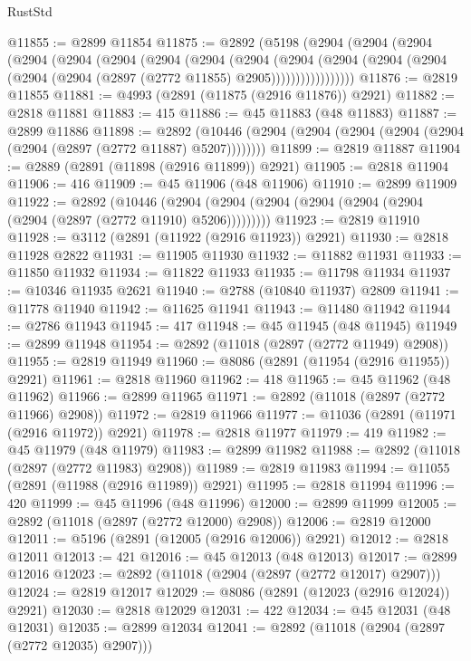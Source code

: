 \begin{lexlean}{RustStd}
\begin{coremodule}
@11855 := @2899 @11854
@11875 := @2892
    (@5198
      (@2904
        (@2904
          (@2904
            (@2904
              (@2904
                (@2904
                  (@2904
                    (@2904
                      (@2904
                        (@2904
                          (@2904
                            (@2904 (@2904 (@2904 (@2904 (@2897 (@2772 @11855) @2905)))))))))))))))))
@11876 := @2819 @11855
@11881 := @4993 (@2891 (@11875 (@2916 @11876)) @2921)
@11882 := @2818 @11881
@11883 := 415
@11886 := @45 @11883 (@48 @11883)
@11887 := @2899 @11886
@11898 := @2892
    (@10446 (@2904 (@2904 (@2904 (@2904 (@2904 (@2904 (@2897 (@2772 @11887) @5207))))))))
@11899 := @2819 @11887
@11904 := @2889 (@2891 (@11898 (@2916 @11899)) @2921)
@11905 := @2818 @11904
@11906 := 416
@11909 := @45 @11906 (@48 @11906)
@11910 := @2899 @11909
@11922 := @2892
    (@10446 (@2904 (@2904 (@2904 (@2904 (@2904 (@2904 (@2904 (@2897 (@2772 @11910) @5206)))))))))
@11923 := @2819 @11910
@11928 := @3112 (@2891 (@11922 (@2916 @11923)) @2921)
@11930 := @2818 @11928 @2822
@11931 := @11905 @11930
@11932 := @11882 @11931
@11933 := @11850 @11932
@11934 := @11822 @11933
@11935 := @11798 @11934
@11937 := @10346 @11935 @2621
@11940 := @2788 (@10840 @11937) @2809
@11941 := @11778 @11940
@11942 := @11625 @11941
@11943 := @11480 @11942
@11944 := @2786 @11943
@11945 := 417
@11948 := @45 @11945 (@48 @11945)
@11949 := @2899 @11948
@11954 := @2892 (@11018 (@2897 (@2772 @11949) @2908))
@11955 := @2819 @11949
@11960 := @8086 (@2891 (@11954 (@2916 @11955)) @2921)
@11961 := @2818 @11960
@11962 := 418
@11965 := @45 @11962 (@48 @11962)
@11966 := @2899 @11965
@11971 := @2892 (@11018 (@2897 (@2772 @11966) @2908))
@11972 := @2819 @11966
@11977 := @11036 (@2891 (@11971 (@2916 @11972)) @2921)
@11978 := @2818 @11977
@11979 := 419
@11982 := @45 @11979 (@48 @11979)
@11983 := @2899 @11982
@11988 := @2892 (@11018 (@2897 (@2772 @11983) @2908))
@11989 := @2819 @11983
@11994 := @11055 (@2891 (@11988 (@2916 @11989)) @2921)
@11995 := @2818 @11994
@11996 := 420
@11999 := @45 @11996 (@48 @11996)
@12000 := @2899 @11999
@12005 := @2892 (@11018 (@2897 (@2772 @12000) @2908))
@12006 := @2819 @12000
@12011 := @5196 (@2891 (@12005 (@2916 @12006)) @2921)
@12012 := @2818 @12011
@12013 := 421
@12016 := @45 @12013 (@48 @12013)
@12017 := @2899 @12016
@12023 := @2892 (@11018 (@2904 (@2897 (@2772 @12017) @2907)))
@12024 := @2819 @12017
@12029 := @8086 (@2891 (@12023 (@2916 @12024)) @2921)
@12030 := @2818 @12029
@12031 := 422
@12034 := @45 @12031 (@48 @12031)
@12035 := @2899 @12034
@12041 := @2892 (@11018 (@2904 (@2897 (@2772 @12035) @2907)))

\end{coremodule}
\end{lexlean}
